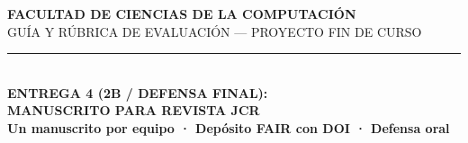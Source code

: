 \documentclass[11pt,a4paper]{article}
\begin{document}
\begin{center}
    {\large\bfseries\color{secdark}FACULTAD DE CIENCIAS DE LA COMPUTACIÓN}\\[2pt]
    {\small\color{secdark}GUÍA Y RÚBRICA DE EVALUACIÓN --- PROYECTO FIN DE CURSO}\\[4pt]
    \textcolor{uteqgold}{\rule{0.7\textwidth}{1.4pt}}\\[8pt]
    {\LARGE\bfseries\color{crimsonfin}ENTREGA 4 (2B / DEFENSA FINAL):}\\[2pt]
    {\LARGE\bfseries\color{crimsonfin}MANUSCRITO PARA REVISTA JCR}\\[6pt]
    {\normalsize\bfseries\color{purpleimpact}Un manuscrito por equipo · Depósito FAIR con DOI · Defensa oral}\\[6pt]
\end{center}
\end{document}
